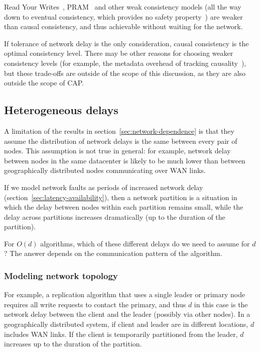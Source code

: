 \documentclass[a4paper,twocolumn,10pt]{article}
\begin{document}
Read Your Writes~\cite{Terry1994fp}, PRAM~\cite{Lipton1988uh} and other weak consistency models (all
the way down to eventual consistency, which provides no safety property~\cite{Bailis2013jc}) are
weaker than causal consistency, and thus achievable without waiting for the network.

If tolerance of network delay is the only consideration, causal consistency is the optimal
consistency level. There may be other reasons for choosing weaker consistency levels (for example,
the metadata overhead of tracking causality~\cite{CharronBost1991ec, Attiya2015dm}), but these
trade-offs are outside of the scope of this discussion, as they are also outside the scope of CAP.

\subsection{Heterogeneous delays}

A limitation of the results in section~\ref{sec:network-dependence} is that they assume the
distribution of network delays is the same between every pair of nodes. This assumption is not true
in general: for example, network delay between nodes in the same datacenter is likely to be much
lower than between geographically distributed nodes communicating over WAN links.

If we model network faults as periods of increased network delay
(section~\ref{sec:latency-availability}), then a network partition is a situation in which the delay
between nodes within each partition remains small, while the delay across partitions increases
dramatically (up to the duration of the partition).

For $O(d)$ algorithms, which of these different delays do we need to assume for $d$? The answer
depends on the communication pattern of the algorithm.

\subsubsection{Modeling network topology}

For example, a replication algorithm that uses a single leader or primary node requires all write
requests to contact the primary, and thus $d$ in this case is the network delay between the client
and the leader (possibly via other nodes). In a geographically distributed system, if client and
leader are in different locations, $d$ includes WAN links. If the client is temporarily partitioned
from the leader, $d$ increases up to the duration of the partition.
\end{document}
